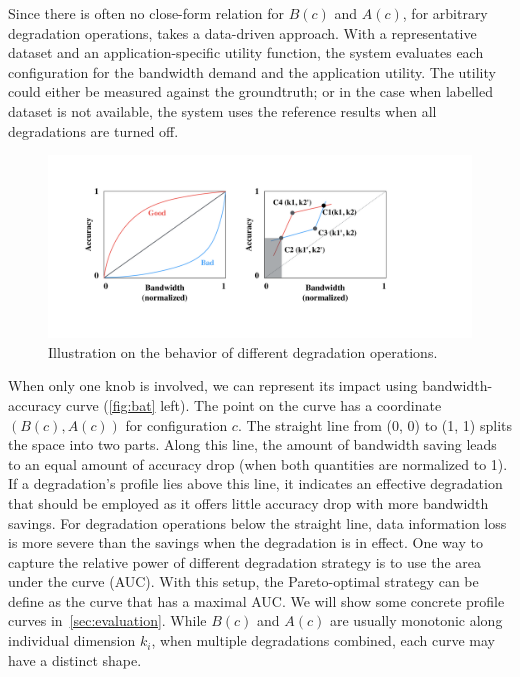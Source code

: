 Since there is often no close-form relation for $B(c)$ and $A(c)$, for arbitrary
degradation operations, \sysname{} takes a data-driven approach. With a
representative dataset and an application-specific utility function, the system
evaluates each configuration for the bandwidth demand and the application
utility. The utility could either be measured against the groundtruth; or in the
case when labelled dataset is not available, the system uses the reference
results when all degradations are turned off.

\begin{figure}
  \centering
  \includegraphics[width=0.6\columnwidth]{figures/degrade.pdf}
  \caption{Illustration on the behavior of different degradation operations.}
  \label{fig:bat}
\end{figure}

When only one knob is involved, we can represent its impact using
bandwidth-accuracy curve (\autoref{fig:bat} left). The point on the curve has a
coordinate $(B(c), A(c))$ for configuration $c$. The straight line from (0, 0)
to (1, 1) splits the space into two parts. Along this line, the amount of
bandwidth saving leads to an equal amount of accuracy drop (when both quantities
are normalized to 1). If a degradation's profile lies above this line, it
indicates an effective degradation that should be employed as it offers little
accuracy drop with more bandwidth savings. For degradation operations below the
straight line, data information loss is more severe than the savings when the
degradation is in effect. One way to capture the relative power of different
degradation strategy is to use the area under the curve (AUC). With this setup,
the Pareto-optimal strategy can be define as the curve that has a maximal AUC.
We will show some concrete profile curves in~\autoref{sec:evaluation}. While
$B(c)$ and $A(c)$ are usually monotonic along individual dimension $k_i$, when
multiple degradations combined, each curve may have a distinct shape.

